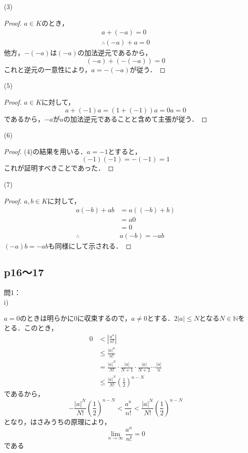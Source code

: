 \documentclass[dvipdfmx,uplatex,11pt]{jsarticle}
\theoremstyle{definition}
\begin{document}
    \begin{itembox}[c]{(3)}
        \begin{proof}
$a \in K$のとき，
\begin{gather*}
    a+(-a)=0 \\
    \therefore (-a)+a =0
\end{gather*}
他方，$-(-a)$は$(-a)$の加法逆元であるから，
\[
    (-a)+(-(-a))=0
\]
これと逆元の一意性により，$a=-(-a)$が従う．
\end{proof}
\end{itembox}
\begin{itembox}[c]{(5)}
    \begin{proof}
    $a \in K$に対して，
    \[
        a+(-1)a=(1+(-1))a =0a =0
    \]
    であるから，$-a$が$a$の加法逆元であることと含めて主張が従う．
    \end{proof}
\end{itembox}
\newpage 
\begin{itembox}[c]{(6)}
    \begin{proof}
    (4)の結果を用いる．$a=-1$とすると，
    \[
        (-1)(-1)=-(-1)=1
    \]
    これが証明すべきことであった．
    \end{proof}
\end{itembox}
\begin{itembox}[c]{(7)}
    \begin{proof}
    $a,b \in K$に対して，
    \begin{align*}
     a(-b)+ab & = a((-b)+b) \\
     & = a0 \\
    & =0 \\
\therefore \quad & a(-b)=-ab 
    \end{align*}
$(-a)b = -ab$も同様にして示される．
\end{proof}
\end{itembox}
%
\newpage
\subsection{p16〜17}
%
問1：\\
i)
%
\begin{leftbar}
    $a=0$のときは明らかに$0$に収束するので，$a \ne 0$とする．$2|a| \le N$となる$N \in \mathbb{N}$をとる．このとき，
    \begin{align*}
         0 &< \left | \frac{a^n}{n!} \right | \\
         &\le \frac{|a|^n}{n!} \\
         &= \frac{|a|^{N}}{N!} \cdot \frac{|a|}{N+1} \cdot \frac{|a|}{N+2} \cdots \frac{|a|}{n} \\
         & \le  \frac{|a|^{N}}{N!} \left(\frac{1}{2} \right)^{n-N}
    \end{align*}
    であるから，
    \[
        - \frac{|a|^{N}}{N!} \left(\frac{1}{2} \right)^{n-N} < \frac{a^n}{n!} < \frac{|a|^{N}}{N!} \left(\frac{1}{2} \right)^{n-N}
    \]
    となり，はさみうちの原理により，
    \[
        \lim_{n \to \infty} \frac{a^n}{n!} =0
    \]
    である
\end{leftbar}
\end{document}
